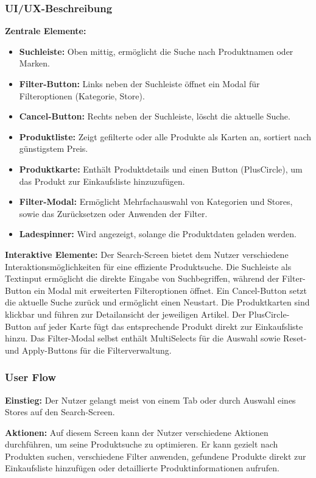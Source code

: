 \documentclass[12pt, a4paper]{report} %
\begin{document}
\subsubsection{UI/UX-Beschreibung}

\textbf{Zentrale Elemente:}
\begin{itemize}
    \item \textbf{Suchleiste:} Oben mittig, ermöglicht die Suche nach Produktnamen oder Marken.
    \item \textbf{Filter-Button:} Links neben der Suchleiste öffnet ein Modal für Filteroptionen (Kategorie, Store).
    \item \textbf{Cancel-Button:} Rechts neben der Suchleiste, löscht die aktuelle Suche.
    \item \textbf{Produktliste:} Zeigt gefilterte oder alle Produkte als Karten an, sortiert nach günstigstem Preis.
    \item \textbf{Produktkarte:} Enthält Produktdetails und einen Button (PlusCircle), um das Produkt zur Einkaufsliste hinzuzufügen.
    \item \textbf{Filter-Modal:} Ermöglicht Mehrfachauswahl von Kategorien und Stores, sowie das Zurücksetzen oder Anwenden der Filter.
    \item \textbf{Ladespinner:} Wird angezeigt, solange die Produktdaten geladen werden.
\end{itemize}

\noindent\textbf{Interaktive Elemente:}
Der Search-Screen bietet dem Nutzer verschiedene Interaktionsmöglichkeiten für eine effiziente Produktsuche. Die Suchleiste als Textinput ermöglicht die direkte Eingabe von Suchbegriffen, während der Filter-Button ein Modal mit erweiterten Filteroptionen öffnet. Ein Cancel-Button setzt die aktuelle Suche zurück und ermöglicht einen Neustart. Die Produktkarten sind klickbar und führen zur Detailansicht der jeweiligen Artikel. Der PlusCircle-Button auf jeder Karte fügt das entsprechende Produkt direkt zur Einkaufsliste hinzu. Das Filter-Modal selbst enthält MultiSelects für die Auswahl sowie Reset- und Apply-Buttons für die Filterverwaltung.

\subsubsection{User Flow}
\textbf{Einstieg:} Der Nutzer gelangt meist von einem Tab oder durch Auswahl eines Stores auf den Search-Screen.

\noindent\textbf{Aktionen:} Auf diesem Screen kann der Nutzer verschiedene Aktionen durchführen, um seine Produktsuche zu optimieren. Er kann gezielt nach Produkten suchen, verschiedene Filter anwenden, gefundene Produkte direkt zur Einkaufsliste hinzufügen oder detaillierte Produktinformationen aufrufen.
\end{document}
